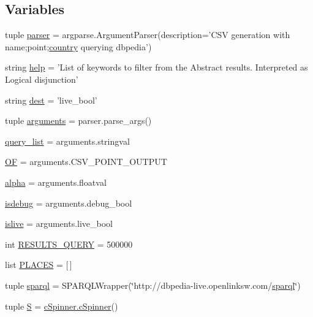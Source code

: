 \subsection*{\-Variables}
\begin{DoxyCompactItemize}
\item 
tuple \hyperlink{namespacevagueplaces_a12260e069d767b0750c1e8f31af9cefb}{parser} = argparse.\-Argument\-Parser(description='\-C\-S\-V generation with name;point;\hyperlink{namespacevagueplaces_a0bc0e84c0011cb9531184b67d05dc0a4}{country} querying dbpedia')
\item 
string \hyperlink{namespacevagueplaces_a23c662171941a2348ade72200850b133}{help} = '\-List of keywords to filter from the \-Abstract results. \-Interpreted as \-Logical disjunction'
\item 
string \hyperlink{namespacevagueplaces_aacfed2e477d0a97080d7d50fb875619e}{dest} = 'live\-\_\-bool'
\item 
tuple \hyperlink{namespacevagueplaces_a3f96b3b895dcb14f99c0348f7c35f90a}{arguments} = parser.\-parse\-\_\-args()
\item 
\hyperlink{namespacevagueplaces_ac63c57bd9dfe86d7d5ff61f7e0d85a39}{query\-\_\-list} = arguments.\-stringval
\item 
\hyperlink{namespacevagueplaces_a206384d666558c145679f9ecdb3dd7c5}{\-O\-F} = arguments.\-C\-S\-V\-\_\-\-P\-O\-I\-N\-T\-\_\-\-O\-U\-T\-P\-U\-T
\item 
\hyperlink{namespacevagueplaces_a968c6f69551718c27a9617d123ac04b0}{alpha} = arguments.\-floatval
\item 
\hyperlink{namespacevagueplaces_a4dcc7b9604e1fd16000c4f36becf8697}{isdebug} = arguments.\-debug\-\_\-bool
\item 
\hyperlink{namespacevagueplaces_ae377bfacd073c19ab35ff25f123eab1a}{islive} = arguments.\-live\-\_\-bool
\item 
int \hyperlink{namespacevagueplaces_a07cd0ae682261d720780294aba9e03f4}{\-R\-E\-S\-U\-L\-T\-S\-\_\-\-Q\-U\-E\-R\-Y} = 500000
\item 
list \hyperlink{namespacevagueplaces_a611b348baa6cc63b93677dea3e188397}{\-P\-L\-A\-C\-E\-S} = \mbox{[}$\,$\mbox{]}
\item 
tuple \hyperlink{namespacevagueplaces_a327d24ca861ef2c176f7c29da06d2da8}{sparql} = \-S\-P\-A\-R\-Q\-L\-Wrapper(\char`\"{}http\-://dbpedia-\/live.\-openlinksw.\-com/\hyperlink{namespacevagueplaces_a327d24ca861ef2c176f7c29da06d2da8}{sparql}\char`\"{})
\item 
tuple \hyperlink{namespacevagueplaces_a62d09a13c6d9f03428f5a6992dd10644}{\-S} = \hyperlink{classcSpinner_1_1cSpinner}{c\-Spinner.\-c\-Spinner}()

\end{DoxyCompactItemize}
